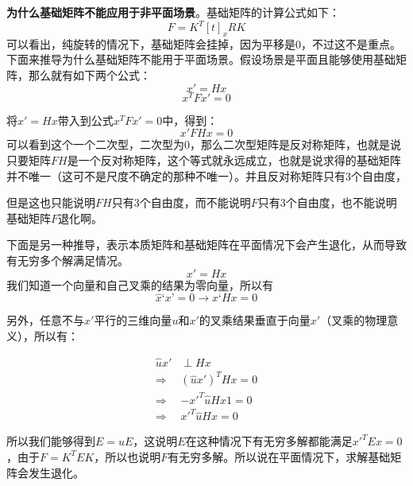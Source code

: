 \textbf{为什么基础矩阵不能应用于非平面场景}。基础矩阵的计算公式如下：
\begin{equation}
	F = K^T[t]_x RK
\end{equation}
可以看出，纯旋转的情况下，基础矩阵会挂掉，因为平移是0，不过这不是重点。下面来推导为什么基础矩阵不能用于平面场景。假设场景是平面且能够使用基础矩阵，那么就有如下两个公式：
\begin{equation}
	x' = Hx
\end{equation}
\begin{equation}
	x^TFx' = 0
\end{equation}

将$x' = Hx$带入到公式$x^TFx'=0$中，得到：
\begin{equation}
	x'FHx = 0
\end{equation}
可以看到这个一个二次型，二次型为0，那么二次型矩阵是反对称矩阵，也就是说只要矩阵$FH$是一个反对称矩阵，这个等式就永远成立，也就是说求得的基础矩阵并不唯一（这可不是尺度不确定的那种不唯一）。并且反对称矩阵只有3个自由度，

\begin{note}
但是这也只能说明$FH$只有3个自由度，而不能说明$F$只有3个自由度，也不能说明基础矩阵$F$退化啊。
\end{note}


下面是另一种推导，表示本质矩阵和基础矩阵在平面情况下会产生退化，从而导致有无穷多个解满足情况。
\begin{equation}
	x' = Hx
\end{equation}
我们知道一个向量和自己叉乘的结果为零向量，所以有
\begin{equation}
	\hat{x}‘x’ = 0 \rightarrow \hat{x}‘Hx = 0
\end{equation}

另外，任意不与$x'$平行的三维向量$u$和$x'$的叉乘结果垂直于向量$x'$（叉乘的物理意义），所以有：


\begin{equation}
\begin{split}
\hat{u}x' & \perp Hx \\
 \Rightarrow &  (\hat{u}x')^THx = 0 \\
 \Rightarrow & -x'^T\hat{u}Hx1 = 0 \\
 \Rightarrow & x'^T\hat{u}Hx = 0
\end{split}
\end{equation}


所以我们能够得到$E=\hat{u}E$，这说明$E$在这种情况下有无穷多解都能满足$x'^TEx = 0$，由于$F=K^TEK$，所以也说明$F$有无穷多解。所以说在平面情况下，求解基础矩阵会发生退化。

